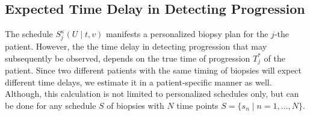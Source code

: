 \subsection{Expected Time Delay in Detecting Progression}
\label{subsec:exp_delay_estimation}
The schedule $S_j^{\kappa}(U \mid t, v)$ manifests a personalized biopsy plan for the $j$-the patient. However, the the time delay in detecting progression that may subsequently be observed, depends on the true time of progression $T^*_j$ of the patient. Since two different patients with the same timing of biopsies will expect different time delays, we estimate it in a patient-specific manner as well. Although, this calculation is not limited to personalized schedules only, but can be done for any schedule $S$ of biopsies with $N$ time points $S=\{s_n \mid n=1,\ldots, N\}$. 

